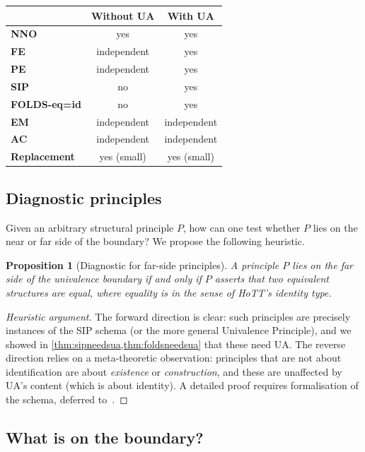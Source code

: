 \documentclass[12pt]{article}
\newtheorem{proposition}[theorem]{Proposition}
\theoremstyle{definition}
\theoremstyle{remark}
\begin{document}
\begin{center}
\begin{tabular}{lcc}
\toprule
& \textbf{Without UA} & \textbf{With UA} \\
\midrule
\textbf{NNO} & yes & yes \\
\textbf{FE} & independent & yes \\
\textbf{PE} & independent & yes \\
\textbf{SIP} & no & yes \\
\textbf{FOLDS-eq=id} & no & yes \\
\textbf{EM} & independent & independent \\
\textbf{AC} & independent & independent \\
\textbf{Replacement} & yes (small) & yes (small) \\
\bottomrule
\end{tabular}
\end{center}

\subsection{Diagnostic principles}

Given an arbitrary structural principle $P$, how can one test whether $P$ lies on the
near or far side of the boundary? We propose the following heuristic.

\begin{proposition}[Diagnostic for far-side principles]
\label{prop:diagnostic}
A principle $P$ lies on the far side of the univalence boundary if and only if $P$
asserts that two equivalent structures are \emph{equal}, where equality is in the
sense of HoTT's identity type.
\end{proposition}
\begin{proof}[Heuristic argument]
The forward direction is clear: such principles are precisely instances of the SIP
schema (or the more general Univalence Principle), and we showed in
\cref{thm:sipneedsua,thm:foldsneedsua} that these need UA.
The reverse direction relies on a meta-theoretic observation: principles that are not
about identification are about \emph{existence} or \emph{construction}, and these are
unaffected by UA's content (which is about identity). A detailed proof requires
formalisation of the schema, deferred to~\cite{ANST2019}.
\end{proof}

\subsection{What is on the boundary?}
\end{document}
